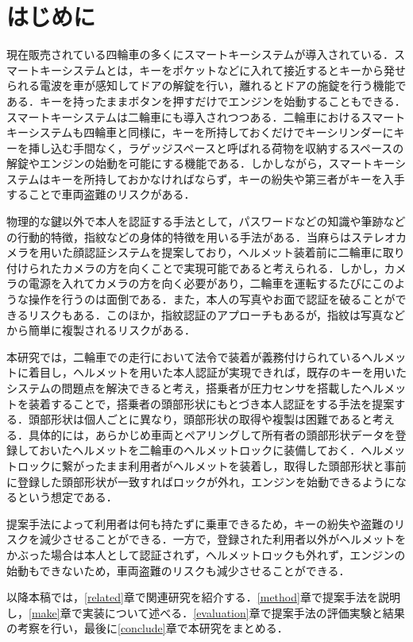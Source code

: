 \chapter{はじめに}
\label{introduction}
現在販売されている四輪車の多くにスマートキーシステムが導入されている．スマートキーシステムとは，キーをポケットなどに入れて接近するとキーから発せられる電波を車が感知してドアの解錠を行い，離れるとドアの施錠を行う機能である．キーを持ったままボタンを押すだけでエンジンを始動することもできる．スマートキーシステムは二輪車にも導入されつつある．二輪車におけるスマートキーシステムも四輪車と同様に，キーを所持しておくだけでキーシリンダーにキーを挿し込む手間なく，ラゲッジスペースと呼ばれる荷物を収納するスペースの解錠やエンジンの始動を可能にする機能である．しかしながら，スマートキーシステムはキーを所持しておかなければならず，キーの紛失や第三者がキーを入手することで車両盗難のリスクがある．\par

物理的な鍵以外で本人を認証する手法として，パスワードなどの知識や筆跡などの行動的特徴，指紋などの身体的特徴を用いる手法がある．当麻ら\cite{face}はステレオカメラを用いた顔認証システムを提案しており，ヘルメット装着前に二輪車に取り付けられたカメラの方を向くことで実現可能であると考えられる．しかし，カメラの電源を入れてカメラの方を向く必要があり，二輪車を運転するたびにこのような操作を行うのは面倒である．また，本人の写真やお面で認証を破ることができるリスクもある．このほか，指紋認証のアプローチもあるが，指紋は写真などから簡単に複製されるリスク\cite{finger_print}がある．\par

本研究では，二輪車での走行において法令で装着が義務付けられているヘルメットに着目し，ヘルメットを用いた本人認証が実現できれば，既存のキーを用いたシステムの問題点を解決できると考え，搭乗者が圧力センサを搭載したヘルメットを装着することで，搭乗者の頭部形状にもとづき本人認証をする手法を提案する．頭部形状は個人ごとに異なり，頭部形状の取得や複製は困難であると考える．具体的には，あらかじめ車両とペアリングして所有者の頭部形状データを登録しておいたヘルメットを二輪車のヘルメットロックに装備しておく．ヘルメットロックに繋がったまま利用者がヘルメットを装着し，取得した頭部形状と事前に登録した頭部形状が一致すればロックが外れ，エンジンを始動できるようになるという想定である．\par

提案手法によって利用者は何も持たずに乗車できるため，キーの紛失や盗難のリスクを減少させることができる．一方で，登録された利用者以外がヘルメットをかぶった場合は本人として認証されず，ヘルメットロックも外れず，エンジンの始動もできないため，車両盗難のリスクも減少させることができる．\par

以降本稿では，\ref{related}章で関連研究を紹介する．\ref{method}章で提案手法を説明し，\ref{make}章で実装について述べる．\ref{evaluation}章で提案手法の評価実験と結果の考察を行い，最後に\ref{conclude}章で本研究をまとめる．